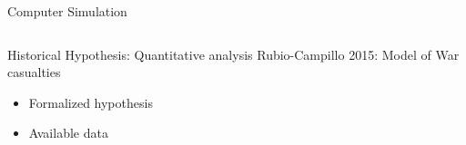 \documentclass[12pt, notes=show]{beamer}
\begin{document}
\begin{frame}{Computer Simulation}
\begin{columns}
\begin{column}{.4\textwidth}
	    
	\end{column}
    \end{columns}
	
\end{frame}



\begin{frame}{Historical Hypothesis: Quantitative analysis}
    Rubio-Campillo 2015:  Model of War casualties
    \begin{itemize}
	\item<1-> Formalized hypothesis 
	\item<2-> Available data
    \end{itemize}

    \begin{center}
    \end{center}


\end{frame}
\end{document}
